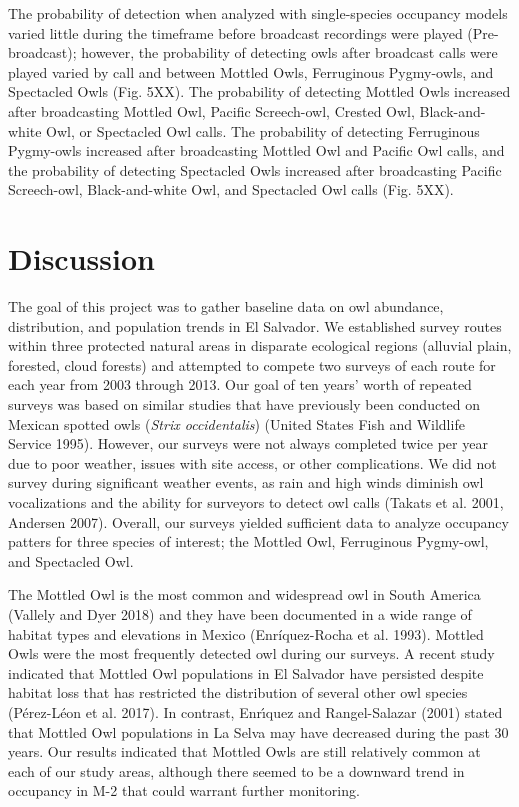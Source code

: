 \documentclass[
]{article}
\begin{document}
The probability of detection when analyzed with single-species occupancy
models varied little during the timeframe before broadcast recordings
were played (Pre-broadcast); however, the probability of detecting owls
after broadcast calls were played varied by call and between Mottled
Owls, Ferruginous Pygmy-owls, and Spectacled Owls (Fig. 5XX). The
probability of detecting Mottled Owls increased after broadcasting
Mottled Owl, Pacific Screech-owl, Crested Owl, Black-and-white Owl, or
Spectacled Owl calls. The probability of detecting Ferruginous
Pygmy-owls increased after broadcasting Mottled Owl and Pacific Owl
calls, and the probability of detecting Spectacled Owls increased after
broadcasting Pacific Screech-owl, Black-and-white Owl, and Spectacled
Owl calls (Fig. 5XX).

\hypertarget{discussion}{%
\section{Discussion}\label{discussion}}

The goal of this project was to gather baseline data on owl abundance,
distribution, and population trends in El Salvador. We established
survey routes within three protected natural areas in disparate
ecological regions (alluvial plain, forested, cloud forests) and
attempted to compete two surveys of each route for each year from 2003
through 2013. Our goal of ten years' worth of repeated surveys was based
on similar studies that have previously been conducted on Mexican
spotted owls (\emph{Strix occidentalis}) (United States Fish and
Wildlife Service 1995). However, our surveys were not always completed
twice per year due to poor weather, issues with site access, or other
complications. We did not survey during significant weather events, as
rain and high winds diminish owl vocalizations and the ability for
surveyors to detect owl calls (Takats et al. 2001, Andersen 2007).
Overall, our surveys yielded sufficient data to analyze occupancy
patters for three species of interest; the Mottled Owl, Ferruginous
Pygmy-owl, and Spectacled Owl.

The Mottled Owl is the most common and widespread owl in South America
(Vallely and Dyer 2018) and they have been documented in a wide range of
habitat types and elevations in Mexico (Enríquez-Rocha et al. 1993).
Mottled Owls were the most frequently detected owl during our surveys. A
recent study indicated that Mottled Owl populations in El Salvador have
persisted despite habitat loss that has restricted the distribution of
several other owl species (Pérez-Léon et al. 2017). In contrast,
Enrı́quez and Rangel-Salazar (2001) stated that Mottled Owl populations
in La Selva may have decreased during the past 30 years. Our results
indicated that Mottled Owls are still relatively common at each of our
study areas, although there seemed to be a downward trend in occupancy
in M-2 that could warrant further monitoring.
\end{document}
